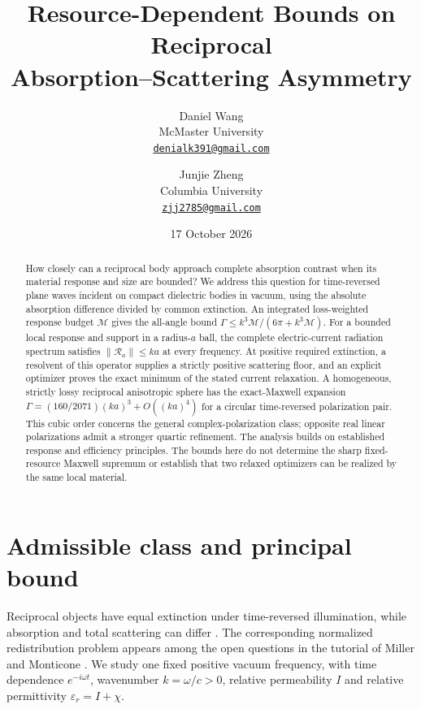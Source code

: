 \documentclass[11pt]{article}
\title{Resource-Dependent Bounds on Reciprocal\\Absorption--Scattering Asymmetry}
\author{Daniel Wang\\McMaster University\\\href{mailto:denialk391@gmail.com}{\texttt{denialk391@gmail.com}}
\and Junjie Zheng\\Columbia University\\\href{mailto:zjj2785@gmail.com}{\texttt{zjj2785@gmail.com}}}
\date{17 October 2026}
\newcommand{\norm}[1]{\lVert #1\rVert}
\begin{document}
\maketitle
\begin{abstract}
How closely can a reciprocal body approach complete absorption contrast when its material response and size are bounded? We address this question for time-reversed plane waves incident on compact dielectric bodies in vacuum, using the absolute absorption difference divided by common extinction. An integrated loss-weighted response budget $\mathcal M$ gives the all-angle bound $\Gamma\leq k^3\mathcal M/(6\pi+k^3\mathcal M)$. For a bounded local response and support in a radius-$a$ ball, the complete electric-current radiation spectrum satisfies $\norm{\mathcal R_a}\leq ka$ at every frequency. At positive required extinction, a resolvent of this operator supplies a strictly positive scattering floor, and an explicit optimizer proves the exact minimum of the stated current relaxation. A homogeneous, strictly lossy reciprocal anisotropic sphere has the exact-Maxwell expansion $\Gamma=(160/2071)(ka)^3+O((ka)^4)$ for a circular time-reversed polarization pair. This cubic order concerns the general complex-polarization class; opposite real linear polarizations admit a stronger quartic refinement. The analysis builds on established response and efficiency principles. The bounds here do not determine the sharp fixed-resource Maxwell supremum or establish that two relaxed optimizers can be realized by the same local material.
\end{abstract}

\section{Admissible class and principal bound}\label{sec:main}
Reciprocal objects have equal extinction under time-reversed illumination, while absorption and total scattering can differ \citep{SounasAlu2014,Hopkins2015,Hopkins2016}. The corresponding normalized redistribution problem appears among the open questions in the tutorial of Miller and Monticone \citep{MillerMonticone2026}. We study one fixed positive vacuum frequency, with time dependence $e^{-i\omega t}$, wavenumber $k=\omega/c>0$, relative permeability $I$ and relative permittivity $\varepsilon_r=I+\chi$.
\end{document}

